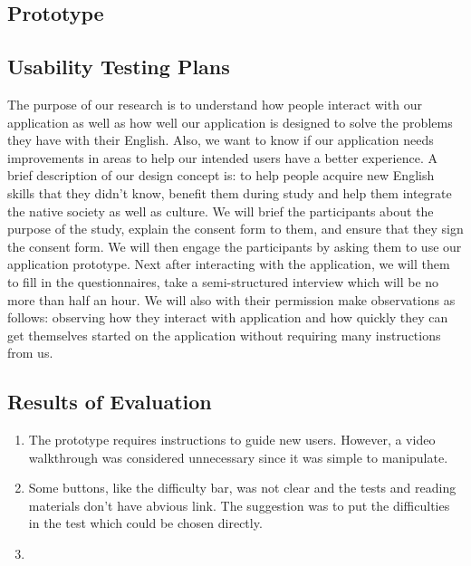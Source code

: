 \documentclass{sigchi}
\begin{document}
\subsection{Prototype}
\subsection{Usability Testing Plans}
The purpose of our research is to understand how people interact with our application as well as how well our application is designed to solve the problems they have with their English. Also, we want to know if our application needs improvements in areas to help our intended users have a better experience. A brief description of our design concept is: to help people acquire new English skills that they didn't know, benefit them during study and help them integrate the native society as well as culture. We will brief the participants about the purpose of the study, explain the consent form to them, and ensure that they sign the consent form. We will then engage the participants by asking them to use our application prototype. Next after interacting with the application, we will them to fill in the questionnaires, take a semi-structured interview which will be no more than half an hour. We will also with their permission make observations as follows: observing how they interact with application and how quickly they can get themselves started on the application without requiring many instructions from us.
\subsection{Results of Evaluation}
\begin{enumerate}
\item The prototype requires instructions to guide new users. However, a video walkthrough was considered unnecessary since it was simple to manipulate.
\item Some buttons, like the difficulty bar, was not clear and the tests and reading materials don’t have abvious link. The suggestion was to put the difficulties in the test which could be chosen directly.
\item
\end{enumerate}

\end{document}
